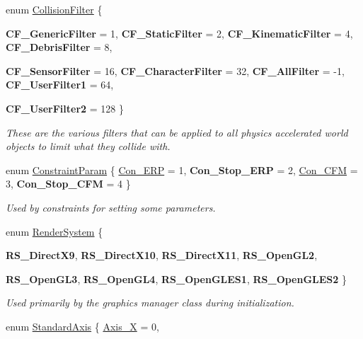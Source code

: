 \begin{DoxyCompactItemize}
enum \hyperlink{namespaceMezzanine_a475283a31c5df11f18e059953f32ace2}{CollisionFilter} \{ \par
{\bfseries CF\_\-GenericFilter} =  1, 
{\bfseries CF\_\-StaticFilter} =  2, 
{\bfseries CF\_\-KinematicFilter} =  4, 
{\bfseries CF\_\-DebrisFilter} =  8, 
\par
{\bfseries CF\_\-SensorFilter} =  16, 
{\bfseries CF\_\-CharacterFilter} =  32, 
{\bfseries CF\_\-AllFilter} =  -\/1, 
{\bfseries CF\_\-UserFilter1} =  64, 
\par
{\bfseries CF\_\-UserFilter2} =  128
 \}
\begin{DoxyCompactList}\small\item\em These are the various filters that can be applied to all physics accelerated world objects to limit what they collide with. \item\end{DoxyCompactList}\item 
enum \hyperlink{namespaceMezzanine_a6c62e8c2938fb203eb7a7072c12176f4}{ConstraintParam} \{ \hyperlink{namespaceMezzanine_a6c62e8c2938fb203eb7a7072c12176f4aa7c686c7bf5328e60c31d6ab05c3dc90}{Con\_\-ERP} =  1, 
{\bfseries Con\_\-Stop\_\-ERP} =  2, 
\hyperlink{namespaceMezzanine_a6c62e8c2938fb203eb7a7072c12176f4a0ae9de16fc96d34ee601f9516d43b9b8}{Con\_\-CFM} =  3, 
{\bfseries Con\_\-Stop\_\-CFM} =  4
 \}
\begin{DoxyCompactList}\small\item\em Used by constraints for setting some parameters. \item\end{DoxyCompactList}\item 
enum \hyperlink{namespaceMezzanine_a1bb0347c37954bc71c4344e4b55c729a}{RenderSystem} \{ \par
{\bfseries RS\_\-DirectX9}, 
{\bfseries RS\_\-DirectX10}, 
{\bfseries RS\_\-DirectX11}, 
{\bfseries RS\_\-OpenGL2}, 
\par
{\bfseries RS\_\-OpenGL3}, 
{\bfseries RS\_\-OpenGL4}, 
{\bfseries RS\_\-OpenGLES1}, 
{\bfseries RS\_\-OpenGLES2}
 \}
\begin{DoxyCompactList}\small\item\em Used primarily by the graphics manager class during initialization. \item\end{DoxyCompactList}\item 
enum \hyperlink{namespaceMezzanine_ab41a00a8c6a47b576dc987ec34e16ba1}{StandardAxis} \{ \hyperlink{namespaceMezzanine_ab41a00a8c6a47b576dc987ec34e16ba1a823c8f182393aef96f017c7279d49126}{Axis\_\-X} =  0, 

\end{DoxyCompactItemize}
